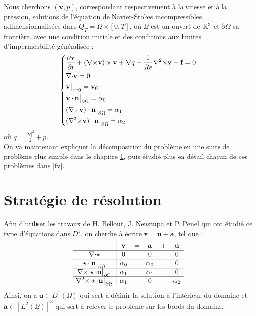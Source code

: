 Nous cherchons $(\mathbf{v},p)$, correspondant respectivement à la vitesse et à la pression, solutions de l'équation de Navier-Stokes incompressibles adimensionnalisées dans $Q_T=\Omega\times[0,T]$, où $\Omega$ est un ouvert de ${\mathbb{R}}^3$ et $\partial\Omega$ sa frontière, avec une condition initiale et des conditions aux limites d'imperméabilité généralisée :
\begin{equation}\label{depart}
\left\{\begin{aligned}
&\frac{\partial \mathbf{v}}{\partial t} + ({\nabla\times}  \mathbf{v})\times \mathbf{v} + {\nabla} q + \frac{1}{Re}{\nabla^2\times}  \mathbf{v}-\mathbf{f} = 0\\
&{\nabla\cdot} \mathbf{v} = 0\\
&\mathbf{v}\big\rvert_{t=0} = \mathbf{v}_0\\
&\mathbf{v}\cdot \mathbf{n}{\big\rvert_{\partial\Omega}} = \alpha_0\\
&({\nabla\times}  \mathbf{v})\cdot \mathbf{n}{\big\rvert_{\partial\Omega}} = \alpha_1\\
&({\nabla^2\times}  \mathbf{v})\cdot \mathbf{n}{\big\rvert_{\partial\Omega}} = \alpha_2
\end{aligned}\right.
\end{equation}
où $q = \frac{|\mathbf{v}|^2}{2}+p$.\\
On va maintenant expliquer la décomposition du problème en une suite de problème plus simple dans le chapitre \ref{local}, puis étudié plus en détail chacun de ces problèmes dans \ref{fv}.

\chapter{Stratégie de résolution}
\label{local}
Afin d'utiliser les travaux de H. Bellout, J. Neustupa et P. Penel \cite{Penel2004} qui ont étudié ce type d'équations dans $D^1$, on cherche à écrire $\mathbf{v}=\mathbf{u}+\mathbf{a}$, tel que :\\
\begin{equation}\label{v}
\begin{array}{c|ccccc}
& \mathbf{v} & = & \mathbf{a} & + & \mathbf{u}\\ \hline
{\nabla\cdot}\star & 0 & & 0 & & 0\\ \hline
\star\cdot \mathbf{n}{\big\rvert_{\partial\Omega}} & \alpha_0 & & \alpha_0 & & 0\\ \hline
{\nabla\times}\star\cdot \mathbf{n}{\big\rvert_{\partial\Omega}} & \alpha_1 & & \alpha_1 & & 0\\ \hline
{\nabla^2\times}\star\cdot \mathbf{n}{\big\rvert_{\partial\Omega}} & \alpha_1 & & 0 & & \alpha_2
\end{array}
\end{equation}
Ainsi, on a $\mathbf{u}\in D^1(\Omega)$ qui sert à définir la solution à l'intérieur du domaine et $\mathbf{a}\in [L^2(\Omega)]^3$ qui sert à relever le problème sur les bords du domaine.

